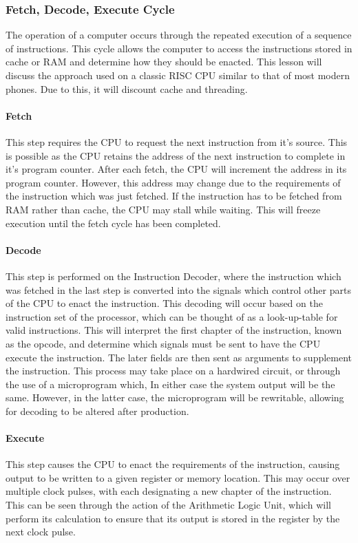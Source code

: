 \documentclass[a4paper,11pt]{report}
\begin{document}
			\subsubsection{Fetch, Decode, Execute Cycle}
				The operation of a computer occurs through the repeated execution of a sequence of instructions.
				This cycle allows the computer to access the instructions stored in cache or RAM and determine how they should be enacted. This lesson will discuss the approach used on a classic RISC CPU similar to that of most modern phones. 
				Due to this, it will discount cache and threading. 
				\paragraph{Fetch}
					This step requires the CPU to request the next instruction from it's source. 
					This is possible as the CPU retains the address of the next instruction to complete in it's program counter. 
					After each fetch, the CPU will increment the address in its program counter. 
					However, this address may change due to the requirements of the instruction which was just fetched. 
					If the instruction has to be fetched from RAM rather than cache, the CPU may stall while waiting.
					This will freeze execution until the fetch cycle has been completed. 
				\paragraph{Decode}
					This step is performed on the Instruction Decoder, where the instruction which was fetched in the last step is converted into the signals which control other parts of the CPU to enact the instruction. 
					This decoding will occur based on the instruction set of the processor, which can be thought of as a look-up-table for valid instructions. 
					This will interpret the first chapter of the instruction, known as the opcode, and determine which signals must be sent to have the CPU execute the instruction. 
					The later fields are then sent as arguments to supplement the instruction. 
					This process may take place on a hardwired circuit, or through the use of a microprogram which, In either case the system output will be the same. 
					However, in the latter case, the microprogram will be rewritable, allowing for decoding to be altered after production. 
				\paragraph{Execute}
					This step causes the CPU to enact the requirements of the instruction, causing output to be written to a given register or memory location. 
					This may occur over multiple clock pulses, with each designating a new chapter of the instruction. 
					This can be seen through the action of the Arithmetic Logic Unit, which will perform its calculation to ensure that its output is stored in the register by the next clock pulse. 
\end{document}

